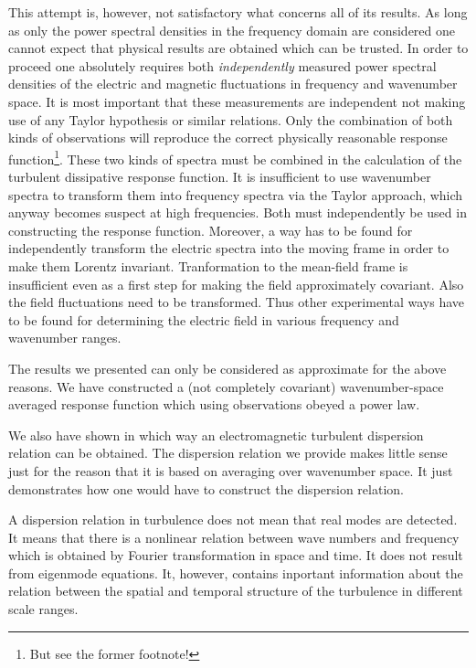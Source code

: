 \documentclass[ ]{copernicus2}
\begin{document}
{{{{This attempt is, however, not satisfactory what concerns all of its results. As long as only the power spectral densities in the frequency domain are considered one cannot expect that physical results are obtained which can be trusted. In order to proceed one} {absolutely requires both \emph{independently} measured power spectral densities of the electric and magnetic fluctuations in frequency and wavenumber space. It is most important that these measurements are {independent} not making use of any Taylor hypothesis or similar relations. Only the combination of both kinds of observations will reproduce the correct physically reasonable response function\footnote{But see the former footnote!}. These two kinds of spectra must be combined in the calculation of the turbulent dissipative response function. It is insufficient to use wavenumber spectra to transform them into frequency spectra via the Taylor approach, which anyway becomes suspect at high frequencies. Both must independently be used in constructing the response function. Moreover, a way has to be found for independently transform the electric spectra into the moving frame in order to make them Lorentz invariant. Tranformation to the mean-field frame is insufficient even as a first step for making the field approximately covariant. Also the field fluctuations need to be transformed. Thus other experimental ways have to be found for determining the electric field in various frequency and wavenumber ranges.} 

The results we presented can only be considered as approximate for the above reasons. We have constructed a (not completely covariant) wavenumber-space averaged response function which using observations obeyed a power law. 

We also have shown in which way an electromagnetic turbulent dispersion relation can be obtained. The dispersion relation we provide makes little sense just for the reason that it is based on averaging over wavenumber space.  It just demonstrates how one would have to construct the dispersion relation. 

A dispersion relation in turbulence does not mean that real modes are detected. It means that there is a nonlinear relation between wave numbers and frequency which is obtained by Fourier transformation in space and time. It does not result from eigenmode equations. It, however, contains inportant information about the relation between the spatial and temporal structure of the turbulence in different scale ranges.

}}}
\end{document}
